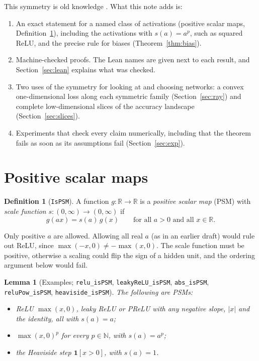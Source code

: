 \documentclass[11pt]{article}
\newtheorem{lemma}[theorem]{Lemma}
\theoremstyle{definition}
\newtheorem{definition}[theorem]{Definition}
\theoremstyle{remark}
\newcommand{\lean}[1]{\texttt{\color{black!70}#1}}
\newcommand{\R}{\mathbb{R}}
\begin{document}
This symmetry is old knowledge
\cite{neyshabur2015path,dinh2017sharp,laurent2018multilinear,lyu2020gradient,kunin2021neural}.
What this note adds is:
\begin{enumerate}
  \item An exact statement for a named class of activations (positive scalar maps,
        Definition~\ref{def:psm}), including the activations with $s(a)=a^p$, such as squared
        ReLU, and the precise rule for biases (Theorem~\ref{thm:bias}).
  \item Machine-checked proofs. The Lean names are given next to each result, and
        Section~\ref{sec:lean} explains what was checked.
  \item Two uses of the symmetry for looking at and choosing networks: a convex one-dimensional
        loss along each symmetric family (Section~\ref{sec:ray}) and complete low-dimensional
        slices of the accuracy landscape (Section~\ref{sec:slices}).
  \item Experiments that check every claim numerically, including that the theorem fails as
        soon as its assumptions fail (Section~\ref{sec:exp}).
\end{enumerate}

\section{Positive scalar maps}\label{sec:psm}

\begin{definition}[\lean{IsPSM}]\label{def:psm}
A function $g:\R\to\R$ is a \emph{positive scalar map} (PSM) with \emph{scale function}
$s:(0,\infty)\to(0,\infty)$ if
\[
  g(a x) = s(a)\, g(x) \qquad \text{for all } a>0 \text{ and all } x\in\R .
\]
\end{definition}

Only positive $a$ are allowed. Allowing all real $a$ (as in an earlier draft) would rule out ReLU,
since $\max(-x,0)\ne -\max(x,0)$. The scale function must be positive, otherwise a scaling could
flip the sign of a hidden unit, and the ordering argument below would fail.

\begin{lemma}[Examples; \lean{relu\_isPSM}, \lean{leakyReLU\_isPSM}, \lean{abs\_isPSM},
\lean{reluPow\_isPSM}, \lean{heaviside\_isPSM}]
The following are PSMs:
\begin{itemize}
  \item ReLU $\max(x,0)$, leaky ReLU or PReLU with any negative slope, $|x|$ and the identity,
        all with $s(a)=a$;
  \item $\max(x,0)^p$ for every $p\in\mathbb{N}$, with $s(a)=a^p$;
  \item the Heaviside step $\mathbf{1}[x>0]$, with $s(a)=1$.
\end{itemize}
\end{lemma}
\end{document}
